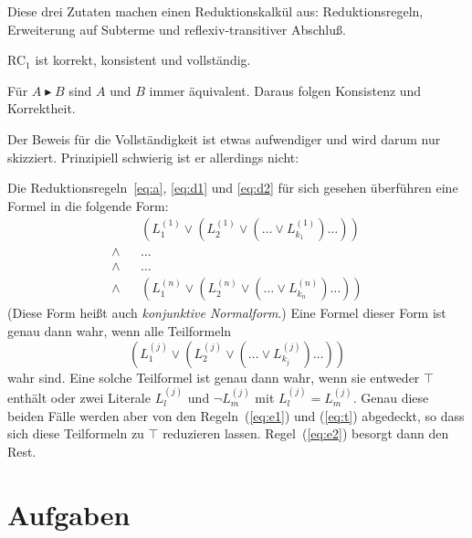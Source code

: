 Diese drei Zutaten machen einen Reduktionskalkül aus:
Reduktionsregeln, Erweiterung auf Subterme und reflexiv-transitiver
Abschluß.

\begin{satz}
  RC$_1$ ist korrekt, konsistent und vollständig.
\end{satz}

\begin{beweis}

Für $A\blacktriangleright B$ sind $A$ und $B$ immer
äquivalent.  Daraus folgen Konsistenz und Korrektheit.

Der Beweis für die Vollständigkeit ist etwas aufwendiger und wird
darum nur skizziert.  Prinzipiell schwierig ist er allerdings nicht:

Die Reduktionsregeln~\ref{eq:a}, \ref{eq:d1} und \ref{eq:d2} für sich
gesehen überführen eine Formel in die folgende Form:
%
\begin{eqnarray*}
  &&(L_1^{(1)}\vee (L_2^{(1)} \vee(\ldots \vee L_{k_1}^{(1)})\ldots))\\
  \wedge&&\ldots\\
  \wedge&&\ldots\\
\wedge&&
  (L_1^{(n)}\vee (L_2^{(n)} \vee(\ldots \vee L_{k_n}^{(n)})\ldots))
\end{eqnarray*}
%
(Diese Form heißt auch \textit{konjunktive Normalform}.)  Eine Formel
dieser Form ist genau dann wahr, wenn alle Teilformeln
%
\begin{displaymath}
(L_1^{(j)}\vee (L_2^{(j)} \vee(\ldots \vee L_{k_j}^{(j)})\ldots))
\end{displaymath}
%
wahr sind.  Eine solche Teilformel ist genau dann wahr, wenn sie
entweder $\top$ enthält oder zwei Literale $L_l^{(j)}$ und $\neg L_m^{(j)}$
mit $L_l^{(j)} = L_m^{(j)}$.  Genau diese beiden Fälle werden
aber von den Regeln~(\ref{eq:e1}) und (\ref{eq:t}) abgedeckt, so dass sich
diese Teilformeln zu $\top$ reduzieren lassen.  Regel~(\ref{eq:e2})
besorgt dann den Rest.
\end{beweis}
                                

\section*{Aufgaben}


